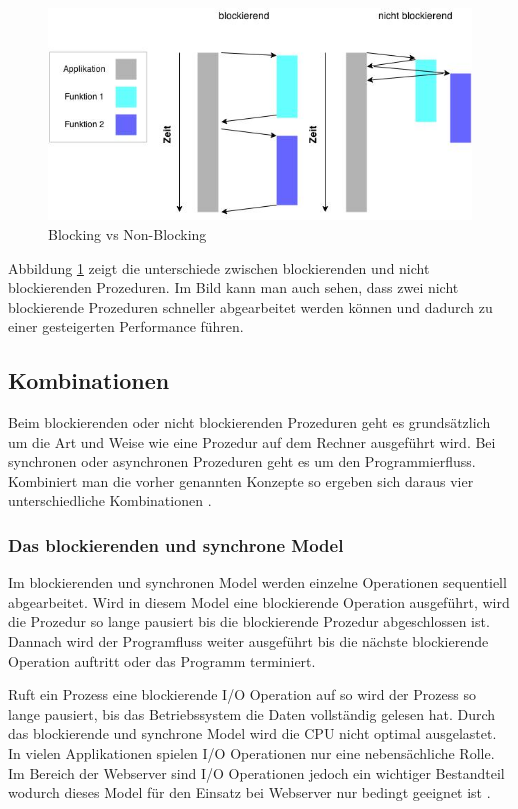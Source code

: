 \begin{figure}[!htb]
  \centering
  \includegraphics[width=13cm]{images/blocking_vs_nonblocking.jpg}
  \caption{
    Blocking vs Non-Blocking
  }
  \label{figure:blocking_vs_non_blocking}
\end{figure}

Abbildung \ref{figure:blocking_vs_non_blocking} zeigt die unterschiede zwischen blockierenden und nicht blockierenden Prozeduren. Im Bild kann man auch sehen, dass zwei nicht blockierende Prozeduren schneller abgearbeitet werden können und dadurch zu einer gesteigerten Performance führen. 

\subsection{Kombinationen}
Beim blockierenden oder nicht blockierenden Prozeduren geht es grundsätzlich um die Art und Weise wie eine Prozedur auf dem Rechner ausgeführt wird. Bei synchronen oder asynchronen Prozeduren geht es um den Programmierfluss. Kombiniert man die vorher genannten Konzepte so ergeben sich daraus vier unterschiedliche Kombinationen \cite[p. 48]{Erb2012}. 

\subsubsection{Das blockierenden und synchrone Model}
Im blockierenden und synchronen Model werden einzelne Operationen sequentiell abgearbeitet. Wird in diesem Model eine blockierende Operation ausgeführt, wird die Prozedur so lange pausiert bis die blockierende Prozedur abgeschlossen ist. Dannach wird der Programfluss weiter ausgeführt bis die nächste blockierende Operation auftritt oder das Programm terminiert.

Ruft ein Prozess eine blockierende I/O Operation auf so wird der Prozess so lange pausiert, bis das Betriebssystem die Daten vollständig gelesen hat. Durch das blockierende und synchrone Model wird die CPU nicht optimal ausgelastet. In vielen Applikationen spielen I/O Operationen nur eine nebensächliche Rolle. Im Bereich der Webserver sind I/O Operationen jedoch ein wichtiger Bestandteil wodurch dieses Model für den Einsatz bei Webserver nur bedingt geeignet ist \cite[p. 48]{Erb2012}.


